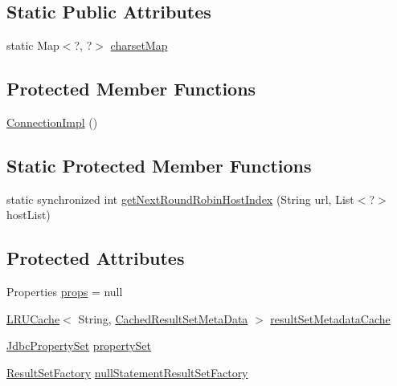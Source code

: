 \subsection*{Static Public Attributes}
\begin{DoxyCompactItemize}
\item 
static Map$<$?, ?$>$ \mbox{\hyperlink{classcom_1_1mysql_1_1cj_1_1jdbc_1_1_connection_impl_a295bb978a807c45f66c387a587a25d36}{charset\+Map}}
\end{DoxyCompactItemize}
\subsection*{Protected Member Functions}
\begin{DoxyCompactItemize}
\item 
\mbox{\hyperlink{classcom_1_1mysql_1_1cj_1_1jdbc_1_1_connection_impl_ac7a247f4c4dbd5b4867c8bed3b8e882b}{Connection\+Impl}} ()
\end{DoxyCompactItemize}
\subsection*{Static Protected Member Functions}
\begin{DoxyCompactItemize}
\item 
static synchronized int \mbox{\hyperlink{classcom_1_1mysql_1_1cj_1_1jdbc_1_1_connection_impl_afffa26efb98bd5458d9731aa79da4b27}{get\+Next\+Round\+Robin\+Host\+Index}} (String url, List$<$?$>$ host\+List)
\end{DoxyCompactItemize}
\subsection*{Protected Attributes}
\begin{DoxyCompactItemize}
\item 
Properties \mbox{\hyperlink{classcom_1_1mysql_1_1cj_1_1jdbc_1_1_connection_impl_a92220c22abfb2c2541804a7f3306fba0}{props}} = null
\item 
\mbox{\hyperlink{classcom_1_1mysql_1_1cj_1_1util_1_1_l_r_u_cache}{L\+R\+U\+Cache}}$<$ String, \mbox{\hyperlink{interfacecom_1_1mysql_1_1cj_1_1jdbc_1_1result_1_1_cached_result_set_meta_data}{Cached\+Result\+Set\+Meta\+Data}} $>$ \mbox{\hyperlink{classcom_1_1mysql_1_1cj_1_1jdbc_1_1_connection_impl_a270646fc06e81a7f33f830a9b0d04aea}{result\+Set\+Metadata\+Cache}}
\item 
\mbox{\hyperlink{interfacecom_1_1mysql_1_1cj_1_1jdbc_1_1_jdbc_property_set}{Jdbc\+Property\+Set}} \mbox{\hyperlink{classcom_1_1mysql_1_1cj_1_1jdbc_1_1_connection_impl_afe27f2588ac46cc33d47369ea433245a}{property\+Set}}
\item 
\mbox{\hyperlink{classcom_1_1mysql_1_1cj_1_1jdbc_1_1result_1_1_result_set_factory}{Result\+Set\+Factory}} \mbox{\hyperlink{classcom_1_1mysql_1_1cj_1_1jdbc_1_1_connection_impl_aabe1561ec0dc4066916c76fcefa1db68}{null\+Statement\+Result\+Set\+Factory}}
\end{DoxyCompactItemize}
